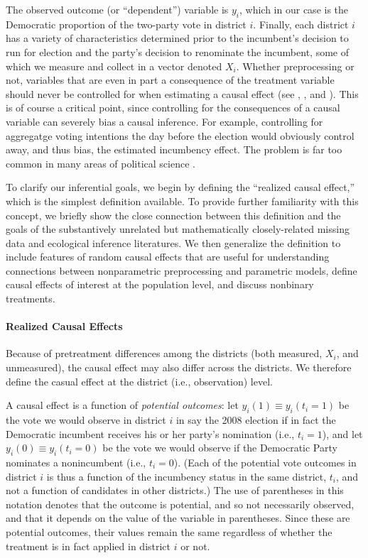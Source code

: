 \documentclass[11pt,titlepage]{article}
\begin{document}
The observed outcome (or ``dependent'') variable is $y_i$, which in
our case is the Democratic proportion of the two-party vote in
district $i$.  Finally, each district $i$ has a variety of
characteristics determined prior to the incumbent's decision to run
for election and the party's decision to renominate the incumbent,
some of which we measure and collect in a vector denoted $X_i$.
Whether preprocessing or not, variables that are even in part a
consequence of the treatment variable should never be controlled for
when estimating a causal effect (see \citealt[][Section 4.2]{Cox58},
\citet{Rosenbaum84}, and \citealt[][pp.73--4]{Rosenbaum02}).  This is
of course a critical point, since controlling for the consequences of
a causal variable can severely bias a causal inference.  For example,
controlling for aggregatge voting intentions the day before the
election would obviously control away, and thus bias, the estimated
incumbency effect.  The problem is far too common in many areas of
political science \citep{KinZen06b}.

To clarify our inferential goals, we begin by defining the ``realized
causal effect,'' which is the simplest definition available.  To
provide further familiarity with this concept, we briefly show the
close connection between this definition and the goals of the
substantively unrelated but mathematically closely-related missing
data and ecological inference literatures.  We then generalize the
definition to include features of random causal effects that are
useful for understanding connections between nonparametric
preprocessing and parametric models, define causal effects of interest
at the population level, and discuss nonbinary treatments.

\paragraph{Realized Causal Effects}
Because of pretreatment differences among the districts (both
measured, $X_i$, and unmeasured), the causal effect may also differ
across the districts.  We therefore define the casual effect at the
district (i.e., observation) level.

A causal effect is a function of \emph{potential outcomes}: let
$y_i(1)\equiv y_i(t_i=1)$ be the vote we would observe in district $i$
in say the 2008 election if in fact the Democratic incumbent receives
his or her party's nomination (i.e., $t_i=1$), and let $y_i(0)\equiv
y_i(t_i=0)$ be the vote we would observe if the Democratic Party
nominates a nonincumbent (i.e., $t_i=0$).  (Each of the potential vote
outcomes in district $i$ is thus a function of the incumbency status
in the same district, $t_i$, and not a function of candidates in other
districts.)  The use of parentheses in this notation denotes that the
outcome is potential, and so not necessarily observed, and that it
depends on the value of the variable in parentheses.  Since these are
potential outcomes, their values remain the same regardless of whether
the treatment is in fact applied in district $i$ or not.
\end{document}
